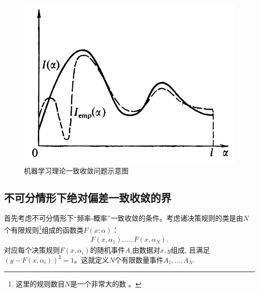 \begin{figure}
\centering
\includegraphics[width=.5\linewidth]{Img/chapter1/frequency.png}
\caption{机器学习理论一致收敛问题示意图}
\label{fig:frequency}
\end{figure}

\subsection{不可分情形下绝对偏差一致收敛的界}
\label{sec:special-case}

首先考虑不可分情形下“频率-概率”一致收敛的条件。考虑诸决策规则的类是由$N$个有限规则\footnote{这里的规则数目$N$是一个非常大的数 \citep{Lerner1980}。}组成的函数类$F(x;\alpha)$：
\begin{align}
F\left(x, \alpha_{1}\right), \ldots, F\left(x, \alpha_{N}\right).
\end{align}
对应每个决策规则$F(x,\alpha_i)$的随机事件$A_i$由数据对$x, y$组成, 且满足$(y - F(x,\alpha_i))^{2} = 1$。这就定义$N$个有限数量事件$A_1,\ldots,A_N$.

